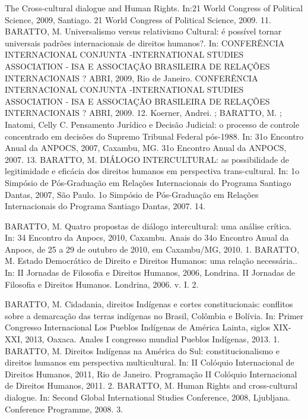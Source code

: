 \begin{cvhonors}
    {The Cross-cultural dialogue and Human Rights. In:21 World Congress of Political Science, 2009, Santiago. 21 World Congress of Political Science, 2009.}
    {}
    {11. }
  \cvhonor
    {BARATTO, M.}
    {Universalismo versus relativismo Cultural: é possível tornar universais padrões internacionais de direitos humanos?. In: CONFERÊNCIA INTERNACIONAL CONJUNTA -INTERNATIONAL STUDIES ASSOCIATION - ISA E ASSOCIAÇÃO BRASILEIRA DE RELAÇÕES INTERNACIONAIS ? ABRI, 2009, Rio de Janeiro. CONFERÊNCIA INTERNACIONAL CONJUNTA -INTERNATIONAL STUDIES ASSOCIATION - ISA E ASSOCIAÇÃO BRASILEIRA DE RELAÇÕES INTERNACIONAIS ? ABRI, 2009.}
    {}
    {12. }
  \cvhonor
    {Koerner, Andrei. ; BARATTO, M. ; Inatomi, Celly C.}
    {Pensamento Jurídico e Decisão Judicial: o processo de controle
    concentrado em decisões do Supremo Tribunal Federal pós-1988. In: 31o Encontro Anual da ANPOCS, 2007, Caxambu,
    MG. 31o Encontro Anual da ANPOCS, 2007.}
    {}
    {13. }
  \cvhonor
    {BARATTO, M.}
    {DIÁLOGO INTERCULTURAL: as possibilidade de legitimidade e eficácia dos direitos humanos em perspectiva trans-cultural. In: 1o Simpósio de Pós-Graduação em Relações Internacionais do Programa Santiago Dantas, 2007, São Paulo. 1o Simpósio de Pós-Graduação em Relações Internacionais do Programa Santiago Dantas, 2007.}
    {}
    {14. }
\end{cvhonors}


\begin{cvhonors}
  \cvhonor
    {BARATTO, M.}
    {Quatro propostas de diálogo intercultural: uma análise crítica. In: 34 Encontro da Anpocs, 2010, Caxambu. Anais do 34o Encontro Anual da Anpocs, de 25 a 29 de outubro de 2010, em Caxambu/MG, 2010.}
    {}
    {1. }
  \cvhonor
    {BARATTO, M.}
  {Estado Democrático de Direito e Direitos Humanos: uma relação necessária.. In: II Jornadas de Filosofia e Direitos Humanos, 2006, Londrina. II Jornadas de Filosofia e Direitos Humanos. Londrina, 2006. v. I.}
    {}
    {2. }
\end{cvhonors}


\begin{cvhonors}
  \cvhonor
    {BARATTO, M.}
    {Cidadania, direitos Indígenas e cortes constitucionais: conflitos sobre a demarcação das terras indígenas no Brasil, Colômbia e Bolívia. In: Primer Congresso Internacional Los Pueblos Indígenas de América Lainta, siglos XIX-XXI, 2013, Oaxaca. Anales I congresso mundial Pueblos Indígenas, 2013.}
    {}
    {1. }
  \cvhonor
    {BARATTO, M.}
    {Direitos Indígenas na América do Sul: constitucionalismo e direitos humanos em perspectiva multicultural. In: II Colóquio Internacional de Direitos Humanos, 2011, Rio de Janeiro. Programação II Colóquio Internacional de Direitos Humanos, 2011.}
    {}
    {2. }
  \cvhonor
    {BARATTO, M.}
    {Human Rights and cross-cultural dialogue. In: Second Global International Studies Conference, 2008, Ljubljana. Conference Programme, 2008.}
    {}
    {3. }
\end{cvhonors}
\pagebreak
{}

